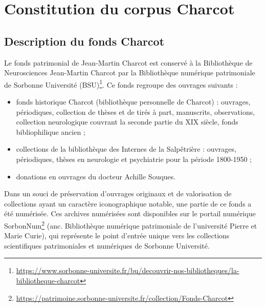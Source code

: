 \label{methodo}
\section{Constitution du corpus Charcot}
\subsection{Description du fonds Charcot}
Le fonds patrimonial de Jean-Martin Charcot est conservé à la Bibliothèque de Neurosciences Jean-Martin Charcot par la Bibliothèque numérique patrimoniale de Sorbonne Université (BSU)\footnote{\url{https://www.sorbonne-universite.fr/bu/decouvrir-nos-bibliotheques/la-bibliotheque-charcot}}. Ce fonds regroupe des ouvrages suivants : 
\begin{itemize}
\item fonds historique Charcot (bibliothèque personnelle de Charcot) : ouvrages, périodiques, collection de thèses et de tirés à part, manuscrits, observations, collection neurologique couvrant la seconde partie du XIX\ieme{} siècle, fonds bibliophilique ancien ;
\item collections de la bibliothèque des Internes de la Salpêtrière : ouvrages, périodiques, thèses en neurologie et psychiatrie pour la période 1800-1950 ;
\item donations en ouvrages du docteur Achille Souques.
\end{itemize}
\medskip
Dans un souci de préservation d'ouvrages originaux et de valorisation de collections ayant un caractère iconographique notable, une partie de ce fonds a été numérisée. Ces archives numérisées sont disponibles sur le portail numérique
SorbonNum\footnote{\url{https://patrimoine.sorbonne-universite.fr/collection/Fonds-Charcot}}  (anc. Bibliothèque numérique patrimoniale de
l'université Pierre et Marie Curie), qui représente le point d'entrée unique vers les collections scientifiques patrimoniales et numériques de Sorbonne Université.

